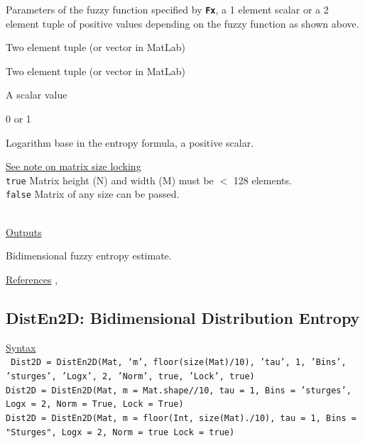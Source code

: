 \documentclass[12pt, a4paper, titlepage, openany]{book}
\begin{document}
\begin{description}[labelsep=1cm, labelwidth=2cm, nosep,,style=multiline,leftmargin=3cm]
\item[\texttt{r}]	Parameters of the fuzzy function specified by \textbf{\texttt{Fx}}, a 1 element scalar or a 2 element tuple of positive values depending on the fuzzy function as shown above.
	\begin{description}[labelsep=14em, labelwidth=10em, nosep,style=multiline,leftmargin=3cm]
	\item[\texttt{\emph{Default}}]		Two element tuple (or vector in MatLab)
	\item[\texttt{\emph{Sigmoid/ModSampEn}}]		Two element tuple (or vector in MatLab)
	\item[\texttt{\emph{Gudermannian}}] A scalar value
	\item[\texttt{\emph{Linear}}]		0 or 1
	\end{description}
\item[\texttt{Logx}]	Logarithm base in the entropy formula, a positive scalar.
\item[\texttt{Lock}]	\hyperlink{bidinote}{\ul{See note on matrix size locking}}\\
					\texttt{true} \hspace{15pt} Matrix height (N) and width (M) must be $<$ 128 elements.\\
					\texttt{false}\hspace{12pt} Matrix of any size can be passed.\\ \
\end{description}

\noindent \ul{Outputs}
\begin{description}[labelsep=1cm, labelwidth=2cm, nosep, style=multiline,leftmargin=3cm]\footnotesize
\item[\texttt{Fuzz2D}]		Bidimensional fuzzy entropy estimate.
\end{description}

\noindent \ul{References}\hspace{1cm}
\cite{Fuzz2D1}, \cite{Fuzz2D2}



\newpage
\subsection{\normalsize DistEn2D: \hspace{15mm} Bidimensional Distribution Entropy}
\noindent\ul{Syntax} \vspace{6mm} \\ \noindent \texttt{\footnotesize
Dist2D = DistEn2D(Mat, ‘m’, floor(size(Mat)/10), 'tau', 1, 'Bins', 'sturges', 'Logx', 2, 'Norm', true, 'Lock', true)\\
Dist2D = DistEn2D(Mat, m = Mat.shape//10, tau = 1, Bins = 'sturges', Logx = 2, Norm = True, Lock = True)\\
Dist2D = DistEn2D(Mat, m = floor(Int, size(Mat)./10), tau = 1, Bins = "Sturges", Logx = 2, Norm = true Lock = true)}
\end{document}
